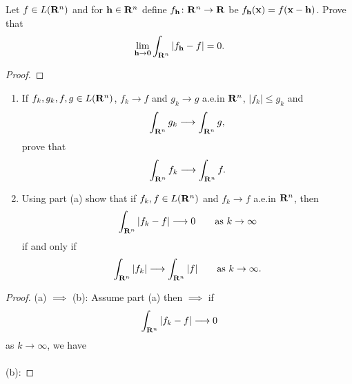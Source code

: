 \begin{problem}
Let $f\in L(\mathbf{R}^n)$ and for $\mathbf{h}\in\mathbf{R}^n$ define
$f_{\mathbf{h}}\colon\mathbf{R}^n\to\mathbf{R}$ be $f_{\mathbf{h}}(\mathbf{x})=
f(\mathbf{x}-\mathbf{h})$. Prove that
\[
\lim_{\mathbf{h}\to\mathbf{0}}\int_{\mathbf{R}^n}\left|f_{\mathbf{h}}-f\right|=0.
\]
\end{problem}
\begin{proof}
\end{proof}

\begin{problem}
\begin{enumerate}[label=(\alph*)]
\item If $f_k,g_k,f,g\in L(\mathbf{R}^n)$, $f_k\to f$ and $g_k\to g$ a.e.\@ in
  $\mathbf{R}^n$, $|f_k|\leq g_k$ and
\[
\int_{\mathbf{R}^n}g_k\longrightarrow\int_{\mathbf{R}^n}g,
\]
prove that
\[
\int_{\mathbf{R}^n} f_k\longrightarrow\int_{\mathbf{R}^n}f.
\]
\item Using part (a) show that if $f_k,f\in L(\mathbf{R}^n)$ and $f_k\to f$
  a.e.\@ in $\mathbf{R}^n$, then
\[
\int_{\mathbf{R}^n}|f_k-f|\longrightarrow 0\qquad\text{as $k\to\infty$}
\]
if and only if
\[
\int_{\mathbf{R}^n}|f_k|\longrightarrow\int_{\mathbf{R}^n}|f|\qquad\text{as $k\to\infty$}.
\]
\end{enumerate}
\end{problem}
\begin{proof}
(a) $\implies$ (b): Assume part (a) then $\implies$ if
\begin{equation}
\label{eq:prep:2:12}
\int_{\mathbf{R}^n}|f_k-f|\longrightarrow 0
\end{equation}
as $k\to\infty$, we have
\\\\
(b):
\end{proof}

